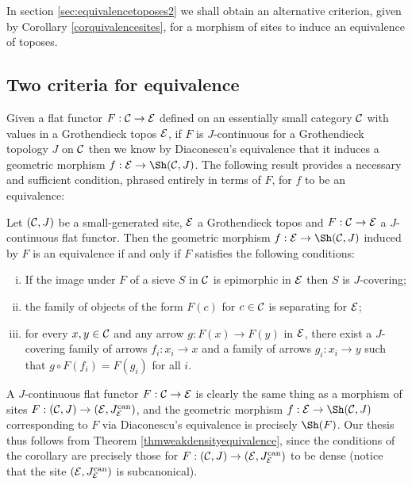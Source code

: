 \documentclass[a4paper,12pt]{article}
\begin{document}
\begin{remark}
	In section \ref{sec:equivalencetoposes2} we shall obtain an alternative criterion, given by Corollary \ref{corquivalencesites}, for a morphism of sites to induce an equivalence of toposes. 
\end{remark}

\subsection{Two criteria for equivalence}

Given a flat functor $F:{\cal C}\to {\cal E}$ defined on an essentially small category $\cal C$ with values in a Grothendieck topos $\cal E$, if $F$ is $J$-continuous for a Grothendieck topology $J$ on $\cal C$ then we know by Diaconescu's equivalence that it induces a geometric morphism $f:{\cal E}\to \Sh({\cal C}, J)$. The following result provides a necessary and sufficient condition, phrased entirely in terms of $F$, for $f$ to be an equivalence:

\begin{corollary}\label{flatequivalence}
	Let $({\cal C}, J)$ be a small-generated site, $\cal E$ a Grothendieck topos and $F:{\cal C}\to {\cal E}$ a $J$-continuous flat functor. Then the geometric morphism $f:{\cal E}\to \Sh({\cal C}, J)$ induced by $F$ is an equivalence if and only if $F$ satisfies the following conditions:
		\begin{enumerate}[(i)]	
			\item If the image under $F$ of a sieve $S$ in $\cal C$ is epimorphic in $\cal E$ then $S$ is $J$-covering;
			\item the family of objects of the form $F(c)$ for $c\in {\cal C}$ is separating for $\cal E$;
			\item for every $x, y\in {\cal C}$ and any arrow $g:F(x)\to F(y)$ in $\cal E$, there exist a $J$-covering family of arrows $f_{i}:x_{i}\to x$ and a family of arrows $g_{i}:x_{i}\to y$ such that $g\circ F(f_{i})=F(g_{i})$ for all $i$.			
		\end{enumerate}
\end{corollary}

\begin{proofs}
	A $J$-continuous flat  functor $F:{\cal C}\to {\cal E}$ is clearly the same thing as a morphism of sites $F:({\cal C}, J)\to ({\cal E}, J_{\cal E}^{\textup{can}})$, and the geometric morphism $f:{\cal E}\to \Sh({\cal C}, J)$ corresponding to $F$ via Diaconescu's equivalence is precisely $\Sh(F)$. Our thesis thus follows from Theorem \ref{thmweakdensityequivalence}, since the conditions of the corollary are precisely those for $F:({\cal C}, J)\to ({\cal E}, J_{\cal E}^{\textup{can}})$ to be dense (notice that the site $({\cal E}, J_{\cal E}^{\textup{can}})$ is subcanonical).
\end{proofs}
\end{document}
